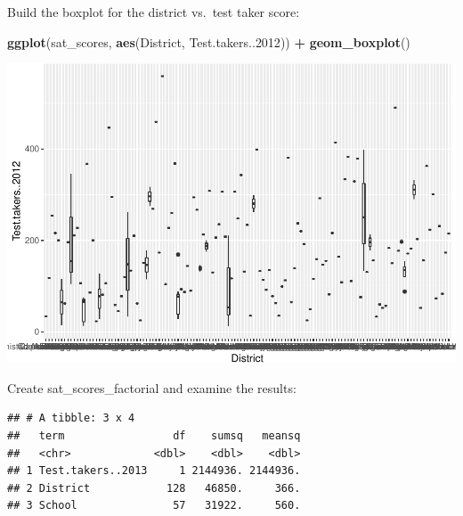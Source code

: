 \documentclass[]{book}
\newenvironment{Shaded}{\begin{snugshade}}{\end{snugshade}}
\newcommand{\DataTypeTok}[1]{\textcolor[rgb]{0.13,0.29,0.53}{#1}}
\newcommand{\DecValTok}[1]{\textcolor[rgb]{0.00,0.00,0.81}{#1}}
\newcommand{\KeywordTok}[1]{\textcolor[rgb]{0.13,0.29,0.53}{\textbf{#1}}}
\newcommand{\NormalTok}[1]{#1}
\newcommand{\OperatorTok}[1]{\textcolor[rgb]{0.81,0.36,0.00}{\textbf{#1}}}
\newcommand{\StringTok}[1]{\textcolor[rgb]{0.31,0.60,0.02}{#1}}
\begin{document}
Build the boxplot for the district vs.~test taker score:

\begin{Shaded}
\begin{Highlighting}[]
\KeywordTok{ggplot}\NormalTok{(sat_scores,}
       \KeywordTok{aes}\NormalTok{(District, Test.takers..}\DecValTok{2012}\NormalTok{)) }\OperatorTok{+}\StringTok{ }
\StringTok{  }\KeywordTok{geom_boxplot}\NormalTok{()}
\end{Highlighting}
\end{Shaded}

\includegraphics{code4stem_files/figure-latex/boxplot with scores-1.pdf}

Create sat\_scores\_factorial and examine the results:

\begin{Shaded}
\end{Shaded}

\begin{verbatim}
## # A tibble: 3 x 4
##   term                 df    sumsq   meansq
##   <chr>             <dbl>    <dbl>    <dbl>
## 1 Test.takers..2013     1 2144936. 2144936.
## 2 District            128   46850.     366.
## 3 School               57   31922.     560.
\end{verbatim}
\end{document}
